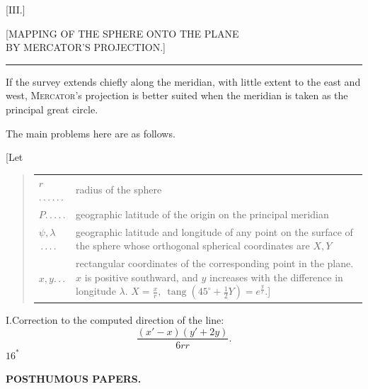 \par\clearpage

\thispagestyle{empty}
\vspace*{4\baselineskip}
\begin{center}
{\large [III.]}\par\bigskip
{\Large [MAPPING OF THE SPHERE ONTO THE PLANE\\
BY MERCATOR'S PROJECTION.]}\par\bigskip
\rule{.09\linewidth}{.4pt}\par\bigskip
[1.]
\end{center}
If the survey extends chiefly along the meridian, with little extent
to the east and west, \textsc{Mercator}'s projection is better suited when the
meridian is taken as the principal great circle.

The main problems here are as follows.

[Let
\begin{quote}
\setlength{\tabcolsep}{0pt}
\begin{tabular}{@{}lp{.82\linewidth}@{}}
\(r\)\enspace.\,.\,.\,.\,.\,. & radius of the sphere\\
\(P\)\enspace.\,.\,.\,.\,. & geographic latitude of the origin on the principal meridian\\
\(\psi,\lambda\)\,.\,.\,.\,. & geographic latitude and longitude of any point on the surface
of the sphere whose orthogonal spherical coordinates are \(X,Y\)\\
\(x,y\)\enspace.\,.\,. & rectangular coordinates of the corresponding point in the plane.
\(x\) is positive southward, and \(y\) increases with the difference in longitude \(\lambda\).
\quad \(X=\frac xr,\ \operatorname{tang}(45^\circ+\tfrac12Y)=e^{\frac yr}\).]
\end{tabular}
\end{quote}
I.\quad Correction to the computed direction of the line:
\[
\frac{(x'-x)(y'+2y)}{6rr}.
\]
\noindent\hfill \(16^{*}\)\hspace*{.14\linewidth}\par

\par\clearpage
\noindent{}\hfill{\small\textbf{POSTHUMOUS PAPERS.}}\hfill\null\par\medskip

